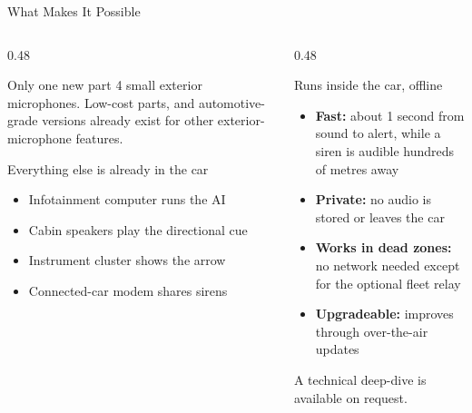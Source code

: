 \documentclass[aspectratio=169,10pt,t,xcolor=table]{beamer}
\begin{document}
\begin{frame}{What Makes It Possible}
\vspace{-0.3cm}
\begin{columns}[T]
\begin{column}{0.48\textwidth}
\begin{block}{Only one new part}
4 small exterior microphones. Low-cost parts, and automotive-grade versions already exist for other exterior-microphone features.
\end{block}
\vspace{10pt}
\begin{block}{Everything else is already in the car}
\begin{itemize}
  \item Infotainment computer runs the AI
  \item Cabin speakers play the directional cue
  \item Instrument cluster shows the arrow
  \item Connected-car modem shares sirens
\end{itemize}
\end{block}
\end{column}
\begin{column}{0.48\textwidth}
\begin{block}{Runs inside the car, offline}
\begin{itemize}
  \item \textbf{Fast:} about 1 second from sound to alert, while a siren is audible hundreds of metres away
  \item \textbf{Private:} no audio is stored or leaves the car
  \item \textbf{Works in dead zones:} no network needed except for the optional fleet relay
  \item \textbf{Upgradeable:} improves through over-the-air updates
\end{itemize}
\end{block}
\vspace{6pt}
{\footnotesize\color{muted} A technical deep-dive is available on request.}
\end{column}
\end{columns}
\end{frame}
\end{document}
